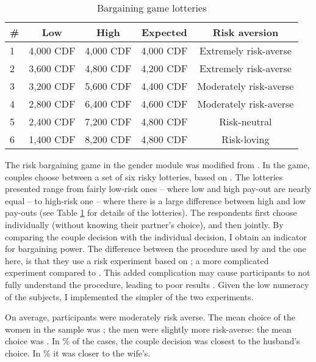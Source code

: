 \documentclass[10pt,a4paper,abstract=on]{scrartcl} %
\begin{document}
\begin{table}[htb]
	\centering
	\caption{Bargaining game lotteries}
	\label{tab:bargaining}
	\begin{tabular}{l c c c c}
	\toprule
	\# & Low & High & Expected & Risk aversion \\
	\hline
	1 & 4,000 CDF & 4,000 CDF & 4,000 CDF & Extremely risk-averse \\
	2 & 3,600 CDF & 4,800 CDF & 4,200 CDF & Extremely risk-averse \\
	3 & 3,200 CDF & 5,600 CDF & 4,400 CDF & Moderately risk-averse \\
	4 & 2,800 CDF & 6,400 CDF & 4,600 CDF & Moderately risk-averse \\
	5 & 2,400 CDF & 7,200 CDF & 4,800 CDF & Risk-neutral \\
	6 & 1,400 CDF & 8,200 CDF & 4,800 CDF & Risk-loving \\ 
	\bottomrule
	\end{tabular}
\end{table}

The risk bargaining game in the gender module was modified from \cite{Martinsson2009}. In the game, couples choose between a set of six risky lotteries, based on \cite{Eckel2002}. The lotteries presented range from fairly low-risk ones -- where low and high pay-out are nearly equal -- to high-risk one -- where there is a large difference between high and low pay-outs (see Table \ref{tab:bargaining} for details of the lotteries). The respondents first choose individually (without knowing their partner's choice), and then jointly. By comparing the couple decision with the individual decision, I obtain an indicator for bargaining power. The difference between the procedure used by \cite{Martinsson2009} and the one here, is that they use a risk experiment based on \cite{Holt2002}; a more complicated experiment compared to \citeauthor{Eckel2002}. This added complication may cause participants to not fully understand the procedure, leading to poor results \citep{Dave2010a}. Given the low numeracy of the subjects, I implemented the simpler of the two experiments.

On average, participants were moderately risk averse. The mean choice of the women in the sample was ; the men were slightly more risk-averse:  the mean choice was . In \% of the cases, the couple decision was closest to the husband's choice. In \% it was closer to the wife's.
\end{document}

